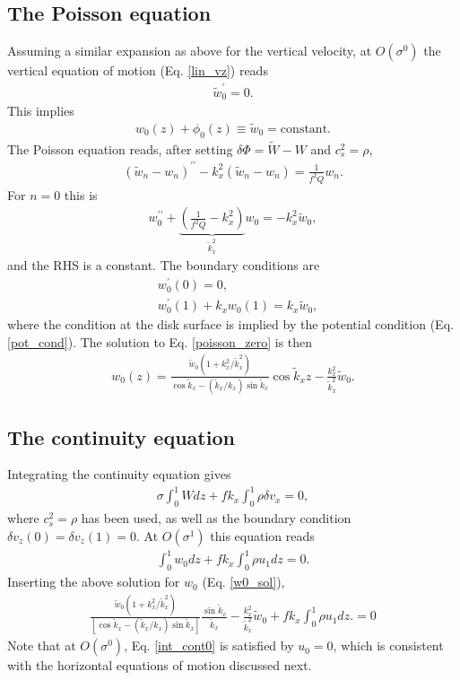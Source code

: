 \documentclass[12pt,preprint]{aastex}
\newcommand{\dd}{\delta}
\newcommand{\dvx}{\dd v_x}
\newcommand{\dvz}{\dd v_z}
\newcommand{\w}{ \widetilde{W}}
\newcommand{\dphi}{\dd \Phi}
\begin{document}
\subsection{The Poisson equation} 
Assuming a similar expansion as above for the vertical velocity, at
$O(\sigma^0)$ the vertical equation of motion (Eq. \ref{lin_vz}) reads
\begin{align}
  \tilde{w}^\prime_0 = 0. 
\end{align}
This implies
\begin{align}
  w_0(z) + \phi_0(z) \equiv \tilde{w} _0 = \mathrm{constant}. 
\end{align}
The Poisson equation reads, after setting $\dphi = \w - W$ and
$c_s^2=\rho$, 
\begin{align}
  \left(\tilde{w}_n-w_n\right)^{\prime\prime} - k_x^2\left(\tilde{w}_n - w_n\right) =
  \frac{1}{f^2Q} w_n. 
\end{align}
For $n=0$ this is
\begin{align}
  w_0^{\prime\prime} + \underbrace{\left(\frac{1}{f^2Q} -
    k_x^2\right)}_{\tilde{k}_x^2}w_0 = -k_x^2 \tilde{w}_0, 
\end{align}
and the RHS is a constant. The boundary conditions are 
\begin{align}
  &w_0^\prime(0) = 0,\\
  &w_0^\prime(1) + k_x w_0(1) = k_x \tilde{w}_0, \label{poisson_zero}
\end{align} 
where the condition at the disk surface is implied by the potential
condition (Eq. \ref{pot_cond}). The solution to Eq. \ref{poisson_zero}
is then
\begin{align}
  w_0(z) = \frac{\tilde{w}_0\left(1 +
    k_x^2/\tilde{k}_x^2\right)}{\cos{\tilde{k}_x} -
    \left(\tilde{k}_x/k_x\right)\sin{\tilde{k}_x}}\cos{\tilde{k}_xz} -
  \frac{k_x^2}{\tilde{k}_x^2}\tilde{w}_0. \label{w0_sol}  
\end{align}

\subsection{The continuity equation} 
Integrating the continuity equation gives
\begin{align}
  \sigma \int_0^1 W dz + f k_x \int_0^1\rho \dvx = 0,  \label{int_cont0}
\end{align}
where $c_s^2 = \rho$ has been used, as well as the boundary condition
$\dvz(0)=\dvz(1)=0$. At $O(\sigma^1)$ this equation reads
\begin{align}
  \int_0^1w_0 dz + f k_x \int_0^1\rho u_1 dz = 0.
\end{align}
Inserting the above solution for $w_0$ (Eq. \ref{w0_sol}), 
\begin{align}
   \frac{\tilde{w}_0\left(1 +
    k_x^2/\tilde{k}_x^2\right)}{\left[\cos{\tilde{k}_x} -
    \left(\tilde{k}_x/k_x\right)\sin{\tilde{k}_x}\right]}\frac{\sin{\tilde{k}_x}}{\tilde{k}_x} -
  \frac{k_x^2}{\tilde{k}_x^2}\tilde{w}_0 + fk_x \int_0^1\rho u_1 dz.
  =0 \label{int_cont} 
\end{align}
Note that at $O(\sigma^0)$, Eq. \ref{int_cont0} is satisfied by
$u_0=0$, which is consistent with the horizontal equations of motion
discussed next. 
\end{document}
